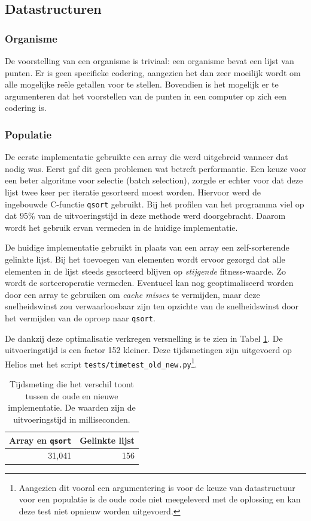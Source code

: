 \documentclass[titlepage,a4paper]{article}
\begin{document}
\subsection{Datastructuren}
\subsubsection{Organisme}
De voorstelling van een organisme is triviaal: een organisme bevat een lijst van punten. Er is geen specifieke codering, aangezien het dan zeer moeilijk wordt om alle mogelijke re\"ele getallen voor te stellen. Bovendien is het mogelijk er te argumenteren dat het voorstellen van de punten in een computer op zich een codering is.
\subsubsection{Populatie}
De eerste implementatie gebruikte een array die werd uitgebreid wanneer dat nodig was. Eerst gaf dit geen problemen wat betreft performantie.
Een keuze voor een beter algoritme voor selectie (batch selection), zorgde er echter voor dat deze lijst twee keer per iteratie gesorteerd moest worden. Hiervoor werd de ingebouwde C-functie \texttt{qsort} gebruikt. Bij het profilen van het programma viel op dat $95$\% van de uitvoeringstijd in deze methode werd doorgebracht. Daarom wordt het gebruik ervan vermeden in de huidige implementatie.

De huidige implementatie gebruikt in plaats van een array een zelf-sorterende gelinkte lijst. Bij het toevoegen van elementen wordt ervoor gezorgd dat alle elementen in de lijst steeds gesorteerd blijven op \textit{stijgende} fitness-waarde. Zo wordt de sorteeroperatie vermeden. Eventueel kan nog geoptimaliseerd worden door een array te gebruiken om \textit{cache misses} te vermijden, maar deze snelheidswinst zou verwaarloosbaar zijn ten opzichte van de snelheidswinst door het vermijden van de oproep naar \texttt{qsort}.

De dankzij deze optimalisatie verkregen versnelling is te zien in Tabel \ref{tab:tijdsmetingen_old_new}. De uitvoeringstijd is een factor 152 kleiner. Deze tijdsmetingen zijn uitgevoerd op Helios met het script \texttt{tests/timetest\_old\_new.py}\footnote{Aangezien dit vooral een argumentering is voor de keuze van datastructuur voor een populatie is de oude code niet meegeleverd met de oplossing en kan deze test niet opnieuw worden uitgevoerd.}.

\begin{table}[here]
\caption{Tijdsmeting die het verschil toont tussen de oude en nieuwe implementatie. De waarden zijn de uitvoeringstijd in milliseconden.}
\label{tab:tijdsmetingen_old_new}
\centering
\begin{tabular}{|r|r|}
\hline
Array en \texttt{qsort} & Gelinkte lijst \\
\hline
31,041 & 156 \\
\hline
\end{tabular}
\end{table}
\end{document}
